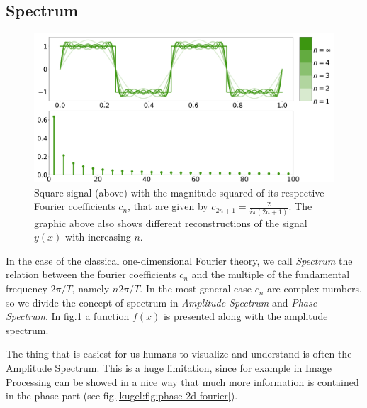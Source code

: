 \subsection{Spectrum}

\begin{figure}
  \centering
  \includegraphics[width=.95\textwidth]{papers/kugel/figures/python/1D-fourier.pdf}
  \caption{Square signal (above) with the magnitude squared of its respective Fourier coefficients $c_n$, that are given by $c_{2n+1}=\frac{2}{i\pi(2n+1)}$. The graphic above also shows different reconstructions of the signal $y(x)$ with increasing $n$.}
  \label{kugel:fig:1d-fourier}
\end{figure}

In the case of the classical one-dimensional Fourier theory, we call \emph{Spectrum} the relation between the fourier coefficients $c_n$ and the multiple 
of the fundamental frequency $2\pi/T$, namely $n 2\pi/T$. In the most general case $c_n$ are complex numbers, so we divide the concept of spectrum in 
\emph{Amplitude Spectrum} and \emph{Phase Spectrum}. In fig.\ref{kugel:fig:1d-fourier} a function $f(x)$ is presented along with the amplitude spectrum.

\begin{figure}
  \centering
  \caption{}
  \label{kugel:fig:phase&amplitude-2d-fourier}
\end{figure}

The thing that is easiest for us humans to visualize and understand is often the Amplitude Spectrum.
This is a huge limitation, since for example in Image Processing can be showed in a nice way that much more information is contained in the phase part (see fig.\ref{kugel:fig:phase-2d-fourier}).

